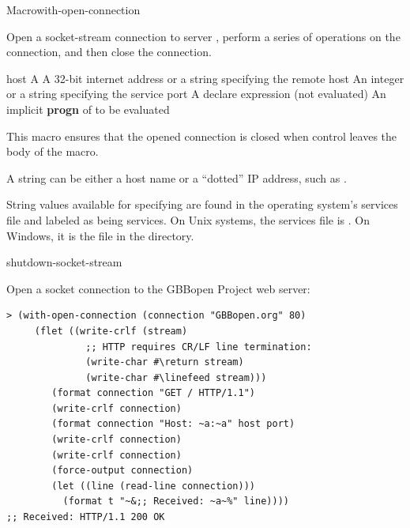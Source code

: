 \documentclass[10pt,twoside,english,pdftex]{article}
\begin{document}

\begin{functiondoc}{Macro}{with-open-connection}%
  {\code{(}\code{)}
    \superstar{}
    \superstar{}}
%
%
%

\fnsyntax

\fnpurpose Open a socket-stream connection to server ,
perform a series of operations on the connection, and then close the
connection.

\fnpackage {}

\fnmodule {}

\fnargs
\begin{args}{host}
\arg[var] A 
\arg[host] A 32-bit internet address or a string specifying the remote host
\arg[port] An integer or a string specifying the service port
\arg[declaration] A declare expression (not evaluated)
\arg[forms] An implicit \textbf{progn} of  to be evaluated
\end{args}

\fndescription This macro ensures that the opened connection is closed when
control leaves the body of the macro.

A  string can be either a host name or a ``dotted'' IP address,
such as .

String values available for specifying  are found in the operating
system's services file and labeled as being  services. On Unix
systems, the services file is . On Windows, it is the file
 in the  directory.

\begin{alsos}{shutdown-socket-stream}
\end{alsos}

\fnexample
Open a socket connection to the GBBopen Project web server:
%
\W\supp
\begin{verbatim}
> (with-open-connection (connection "GBBopen.org" 80)
     (flet ((write-crlf (stream)
              ;; HTTP requires CR/LF line termination: 
              (write-char #\return stream)
              (write-char #\linefeed stream)))
        (format connection "GET / HTTP/1.1")
        (write-crlf connection)
        (format connection "Host: ~a:~a" host port)
        (write-crlf connection)
        (write-crlf connection)
        (force-output connection)
        (let ((line (read-line connection)))
          (format t "~&;; Received: ~a~%" line))))
;; Received: HTTP/1.1 200 OK
\end{verbatim}

\end{functiondoc}
\end{document}

